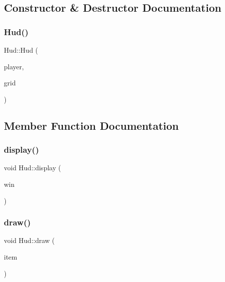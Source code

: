 \subsection{Constructor \& Destructor Documentation}
\mbox{\label{class_hud_a473653a9ce3114aa55b48acf77294899}} 
\subsubsection{\texorpdfstring{Hud()}{Hud()}}
{\footnotesize\ttfamily Hud\+::\+Hud (\begin{DoxyParamCaption}\item[{\mbox{\hyperlink{class_player}{Player}} \&}]{player,  }\item[{\mbox{\hyperlink{class_grid}{Grid}} \&}]{grid }\end{DoxyParamCaption})}



\subsection{Member Function Documentation}
\mbox{\label{class_hud_aec596c1aa18c05aed1c36144698de4bf}} 
\subsubsection{\texorpdfstring{display()}{display()}}
{\footnotesize\ttfamily void Hud\+::display (\begin{DoxyParamCaption}\item[{sf\+::\+Render\+Window \&}]{win }\end{DoxyParamCaption})}

\mbox{\label{class_hud_a2328332d9175e59b8f3c6db45438ad07}} 
\subsubsection{\texorpdfstring{draw()}{draw()}}
{\footnotesize\ttfamily void Hud\+::draw (\begin{DoxyParamCaption}\item[{sf\+::\+Drawable \&}]{item }\end{DoxyParamCaption})}

